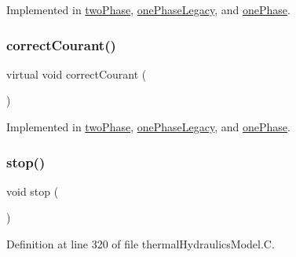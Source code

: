 Implemented in \hyperlink{classFoam_1_1thermalHydraulicsModels_1_1twoPhase_ab339c59ef518e68e6ba82997b9d06454}{two\+Phase}, \hyperlink{classFoam_1_1thermalHydraulicsModels_1_1onePhaseLegacy_ab339c59ef518e68e6ba82997b9d06454}{one\+Phase\+Legacy}, and \hyperlink{classFoam_1_1thermalHydraulicsModels_1_1onePhase_ab339c59ef518e68e6ba82997b9d06454}{one\+Phase}.

\mbox{\label{classFoam_1_1thermalHydraulicsModel_a90ec132609df53c542c8e81b7c4b408f}} 
\subsubsection{\texorpdfstring{correct\+Courant()}{correctCourant()}}
{\footnotesize\ttfamily virtual void correct\+Courant (\begin{DoxyParamCaption}{ }\end{DoxyParamCaption})\hspace{0.3cm}{\ttfamily [pure virtual]}}



Implemented in \hyperlink{classFoam_1_1thermalHydraulicsModels_1_1twoPhase_a9e1998999bc6cfc318ce37ca9499742e}{two\+Phase}, \hyperlink{classFoam_1_1thermalHydraulicsModels_1_1onePhaseLegacy_a9e1998999bc6cfc318ce37ca9499742e}{one\+Phase\+Legacy}, and \hyperlink{classFoam_1_1thermalHydraulicsModels_1_1onePhase_a9e1998999bc6cfc318ce37ca9499742e}{one\+Phase}.

\mbox{\label{classFoam_1_1thermalHydraulicsModel_a8c528baf37154d347366083f0f816846}} 
\subsubsection{\texorpdfstring{stop()}{stop()}}
{\footnotesize\ttfamily void stop (\begin{DoxyParamCaption}{ }\end{DoxyParamCaption})}



Definition at line 320 of file thermal\+Hydraulics\+Model.\+C.

